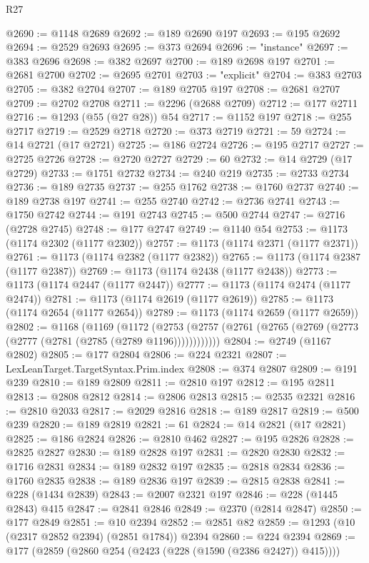 \begin{lexlean}{R27}
\begin{coremodule}
@2690 := @1148 @2689
@2692 := @189 @2690 @197
@2693 := @195 @2692
@2694 := @2529 @2693
@2695 := @373 @2694
@2696 := "instance"
@2697 := @383 @2696
@2698 := @382 @2697
@2700 := @189 @2698 @197
@2701 := @2681 @2700
@2702 := @2695 @2701
@2703 := "explicit"
@2704 := @383 @2703
@2705 := @382 @2704
@2707 := @189 @2705 @197
@2708 := @2681 @2707
@2709 := @2702 @2708
@2711 := @2296 (@2688 @2709)
@2712 := @177 @2711
@2716 := @1293 (@55 (@27 @28)) @54
@2717 := @1152 @197
@2718 := @255 @2717
@2719 := @2529 @2718
@2720 := @373 @2719
@2721 := 59
@2724 := @14 @2721 (@17 @2721)
@2725 := @186 @2724
@2726 := @195 @2717
@2727 := @2725 @2726
@2728 := @2720 @2727
@2729 := 60
@2732 := @14 @2729 (@17 @2729)
@2733 := @1751 @2732
@2734 := @240 @219
@2735 := @2733 @2734
@2736 := @189 @2735
@2737 := @255 @1762
@2738 := @1760 @2737
@2740 := @189 @2738 @197
@2741 := @255 @2740
@2742 := @2736 @2741
@2743 := @1750 @2742
@2744 := @191 @2743
@2745 := @500 @2744
@2747 := @2716 (@2728 @2745)
@2748 := @177 @2747
@2749 := @1140 @54
@2753 := @1173 (@1174 @2302 (@1177 @2302))
@2757 := @1173 (@1174 @2371 (@1177 @2371))
@2761 := @1173 (@1174 @2382 (@1177 @2382))
@2765 := @1173 (@1174 @2387 (@1177 @2387))
@2769 := @1173 (@1174 @2438 (@1177 @2438))
@2773 := @1173 (@1174 @2447 (@1177 @2447))
@2777 := @1173 (@1174 @2474 (@1177 @2474))
@2781 := @1173 (@1174 @2619 (@1177 @2619))
@2785 := @1173 (@1174 @2654 (@1177 @2654))
@2789 := @1173 (@1174 @2659 (@1177 @2659))
@2802 := @1168
    (@1169
      (@1172 (@2753 (@2757 (@2761 (@2765 (@2769 (@2773 (@2777 (@2781 (@2785 (@2789 @1196))))))))))))
@2804 := @2749 (@1167 @2802)
@2805 := @177 @2804
@2806 := @224 @2321
@2807 := LexLeanTarget.TargetSyntax.Prim.index
@2808 := @374 @2807
@2809 := @191 @239
@2810 := @189 @2809
@2811 := @2810 @197
@2812 := @195 @2811
@2813 := @2808 @2812
@2814 := @2806 @2813
@2815 := @2535 @2321
@2816 := @2810 @2033
@2817 := @2029 @2816
@2818 := @189 @2817
@2819 := @500 @239
@2820 := @189 @2819
@2821 := 61
@2824 := @14 @2821 (@17 @2821)
@2825 := @186 @2824
@2826 := @2810 @462
@2827 := @195 @2826
@2828 := @2825 @2827
@2830 := @189 @2828 @197
@2831 := @2820 @2830
@2832 := @1716 @2831
@2834 := @189 @2832 @197
@2835 := @2818 @2834
@2836 := @1760 @2835
@2838 := @189 @2836 @197
@2839 := @2815 @2838
@2841 := @228 (@1434 @2839)
@2843 := @2007 @2321 @197
@2846 := @228 (@1445 @2843) @415
@2847 := @2841 @2846
@2849 := @2370 (@2814 @2847)
@2850 := @177 @2849
@2851 := @10 @2394
@2852 := @2851 @82
@2859 := @1293 (@10 (@2317 @2852 @2394) (@2851 @1784)) @2394
@2860 := @224 @2394
@2869 := @177 (@2859 (@2860 @254 (@2423 (@228 (@1590 (@2386 @2427)) @415))))

\end{coremodule}
\end{lexlean}
